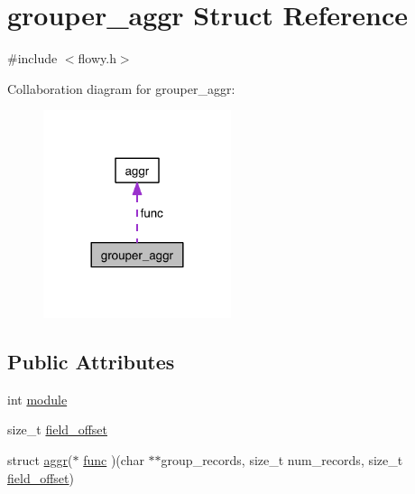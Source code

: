 \hypertarget{structgrouper__aggr}{\section{grouper\-\_\-aggr \-Struct \-Reference}
\label{structgrouper__aggr}
}


{\ttfamily \#include $<$flowy.\-h$>$}



\-Collaboration diagram for grouper\-\_\-aggr\-:
\nopagebreak
\begin{figure}[H]
\begin{center}
\leavevmode
\includegraphics[width=156pt]{structgrouper__aggr__coll__graph}
\end{center}
\end{figure}
\subsection*{\-Public \-Attributes}
\begin{DoxyCompactItemize}
\item 
int \hyperlink{structgrouper__aggr_aa154af699198c80586b3f05d06829dda}{module}
\item 
size\-\_\-t \hyperlink{structgrouper__aggr_aa9a662390c468b6ddf79e57228af09ef}{field\-\_\-offset}
\item 
struct \hyperlink{structaggr}{aggr}($\ast$ \hyperlink{structgrouper__aggr_a6c34e047d2d5ccfbcd1371703c4c04b1}{func} )(char $\ast$$\ast$group\-\_\-records, size\-\_\-t num\-\_\-records, size\-\_\-t \hyperlink{structgrouper__aggr_aa9a662390c468b6ddf79e57228af09ef}{field\-\_\-offset})
\end{DoxyCompactItemize}


